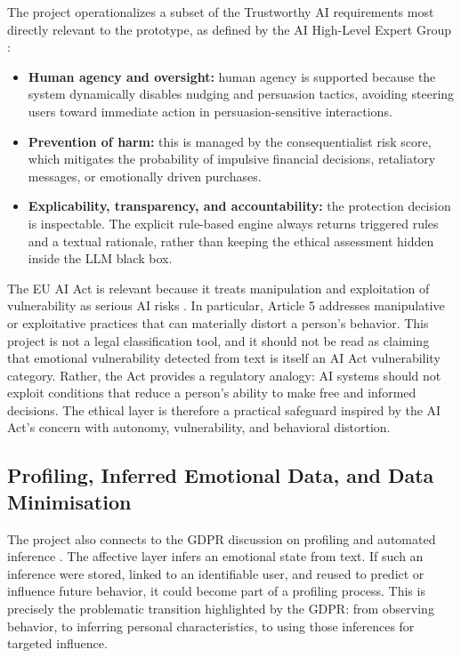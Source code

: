 \documentclass[11pt,a4paper]{article}
\begin{document}
The project operationalizes a subset of the Trustworthy AI requirements most
directly relevant to the prototype, as defined by the AI High-Level Expert Group
\cite{hleg2019}:
\begin{itemize}[leftmargin=1.8em]
\item \textbf{Human agency and oversight:} human agency is supported because the system
dynamically disables nudging and persuasion tactics, avoiding steering users toward
immediate action in persuasion-sensitive interactions.
\item \textbf{Prevention of harm:} this is managed by the consequentialist risk score,
which mitigates the probability of impulsive financial decisions, retaliatory messages, or
emotionally driven purchases.
\item \textbf{Explicability, transparency, and accountability:} the protection decision is
inspectable. The explicit rule-based engine always returns triggered rules and a textual
rationale, rather than keeping the ethical assessment hidden inside the LLM black box.
\end{itemize}

The EU AI Act is relevant because it treats manipulation and exploitation of vulnerability
as serious AI risks \cite{euaiact}. In particular, Article 5 addresses manipulative or
exploitative practices that can materially distort a person's behavior. This project is not
a legal classification tool, and it should not be read as claiming that emotional
vulnerability detected from text is itself an AI Act vulnerability category. Rather, the Act
provides a regulatory analogy: AI systems should not exploit conditions that reduce a
person's ability to make free and informed decisions. The ethical layer is therefore a
practical safeguard inspired by the AI Act's concern with autonomy, vulnerability, and
behavioral distortion.

\subsection{Profiling, Inferred Emotional Data, and Data Minimisation}

The project also connects to the GDPR discussion on profiling and automated inference
\cite{gdpr}. The affective layer infers an emotional state from text. If such an inference
were stored, linked to an identifiable user, and reused to predict or influence future
behavior, it could become part of a profiling process. This is precisely the problematic
transition highlighted by the GDPR: from observing behavior, to inferring
personal characteristics, to using those inferences for targeted influence.
\end{document}
